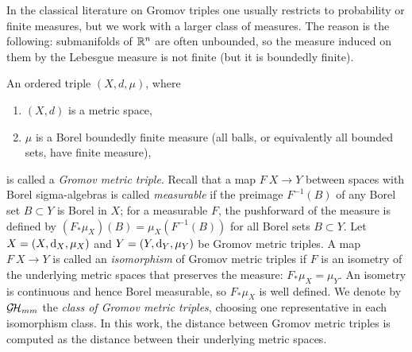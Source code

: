 In the classical literature on Gromov triples one usually restricts to probability or finite measures, but we work with a larger class of measures.
The reason is the following: submanifolds of $\mathbb R^n$ are often unbounded, so the measure induced on them by the Lebesgue measure is not finite (but it is boundedly finite).
\begin{define}
  An ordered triple $(X, d, \mu)$, where
  \begin{enumerate}
    \item $(X,d)$ is a metric space,
    \item $\mu$ is a Borel boundedly finite measure (all balls, or equivalently all bounded sets, have finite measure),
  \end{enumerate}
  is called a \emph{Gromov metric triple}.
  Recall that a map $F \: X \to Y$ between spaces with Borel sigma-algebras is called \emph{measurable} if the preimage $F^{-1}(B)$ of any Borel set $B \subset Y$ is Borel in $X$; for a measurable $F$, the pushforward of the measure is defined by $(F_* \mu_X)(B) = \mu_X(F^{-1}(B))$ for all Borel sets $B \subset Y$.
  Let $X = (X, \operatorname{d}_{X}, \mu_X)$ and $Y = (Y, \operatorname{d}_{Y}, \mu_Y)$ be Gromov metric triples. A map $F \: X \to Y$ is called an \emph{isomorphism} of Gromov metric triples if $F$ is an isometry of the underlying metric spaces that preserves the measure: $F_* \mu_X = \mu_Y$. An isometry is continuous and hence Borel measurable, so $F_* \mu_X$ is well defined.
  We denote by $\operatorname{\mathcal{G\!H}}_{mm}$ the \emph{class of Gromov metric triples}, choosing one representative in each isomorphism class.
  In this work, the distance between Gromov metric triples is computed as the distance between their underlying metric spaces.
\end{define}

